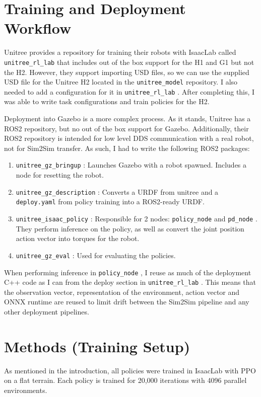 \documentclass[11pt]{article}
\newcommand{\code}[1]{%
    \colorbox{mdBg}{\textcolor{mdText}{\texttt{#1}}}%
}
\begin{document}
\section{Training and Deployment Workflow}
Unitree provides a repository for training their robots with IsaacLab called \code{unitree\_rl\_lab} that includes out of the box support for the H1 and G1 but not the H2. However, they support importing USD files, so we can use the supplied USD file for the Unitree H2 located in the \code{unitree\_model} repository. I also needed to add a configuration for it in \code{unitree\_rl\_lab}. After completing this, I was able to write task configurations and train policies for the H2.

Deployment into Gazebo is a more complex process. As it stands, Unitree has a ROS2 repository, but no out of the box support for Gazebo. Additionally, their ROS2 repository is intended for low level DDS communication with a real robot, not for Sim2Sim transfer. As such, I had to write the following ROS2 packages:
\begin{enumerate}
    \item \code{unitree\_gz\_bringup}: Launches Gazebo with a robot spawned. Includes a node for resetting the robot.
    \item \code{unitree\_gz\_description}: Converts a URDF from unitree and a \code{deploy.yaml} from policy training into a ROS2-ready URDF.
    \item \code{unitree\_isaac\_policy}: Responsible for 2 nodes: \code{policy\_node} and \code{pd\_node}. They perform inference on the policy, as well as convert the joint position action vector into torques for the robot.
    \item \code{unitree\_gz\_eval}: Used for evaluating the policies.
\end{enumerate}
When performing inference in \code{policy\_node}, I reuse as much of the deployment C++ code as I can from the deploy section in \code{unitree\_rl\_lab}. This means that the observation vector, representation of the environment, action vector and ONNX runtime are reused to limit drift between the Sim2Sim pipeline and any other deployment pipelines.

\section{Methods (Training Setup)}

As mentioned in the introduction, all policies were trained in IsaacLab with PPO on a flat terrain. Each policy is trained for 20,000 iterations with 4096 parallel environments.
\end{document}
